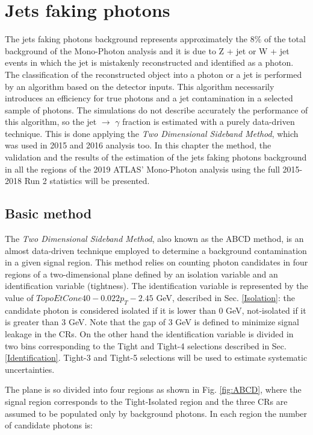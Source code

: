 \documentclass[11pt,a4paper,twoside,openright]{book}
\begin{document}
\chapter{Jets faking photons}

The jets faking photons background represents approximately the 8\% of the total background of the Mono-Photon analysis and it is due to Z + jet or W + jet events in which the jet is mistakenly reconstructed and identified as a photon. The classification of the reconstructed object into a photon or a jet is performed by an algorithm based on the detector inputs. This algorithm necessarily introduces an efficiency for true photons and a jet contamination in a selected sample of photons. The simulations do not describe accurately the performance of this algorithm, so the jet $\rightarrow$ $\gamma$ fraction is estimated with a purely data-driven technique. This is done applying the \textit{Two Dimensional Sideband Method}, which was used in 2015 and 2016 analysis too.
In this chapter the method, the validation and the results of the estimation of the jets faking photons background in all the regions of the 2019 ATLAS' Mono-Photon analysis using the full 2015-2018 Run 2 statistics will be presented.


\section{Basic method}

The \textit{Two Dimensional Sideband Method}, also known as the ABCD method, is an almost data-driven technique employed to determine a background contamination in a given signal region. This method relies on counting photon candidates in four regions of a two-dimensional plane defined by an isolation variable and an identification variable (tightness). The identification variable is represented by the value of $TopoEtCone40 - 0.022p_{T} - 2.45$ GeV, described in Sec. \ref{Isolation}: the candidate photon is considered isolated if it is lower than 0 GeV, not-isolated if it is greater than 3 GeV. Note that the gap of 3 GeV is defined to minimize signal leakage in the CRs. On the other hand the identification variable is divided in two bins corresponding to the Tight and Tight-4 selections described in Sec. \ref{Identification}. Tight-3 and Tight-5 selections will be used to estimate systematic uncertainties. 

The plane is so divided into four regions as shown in Fig. \ref{fig:ABCD}, where the signal region corresponds to the Tight-Isolated region and the three CRs are assumed to be populated only by background photons. In each region the number of candidate photons is:
\end{document}
